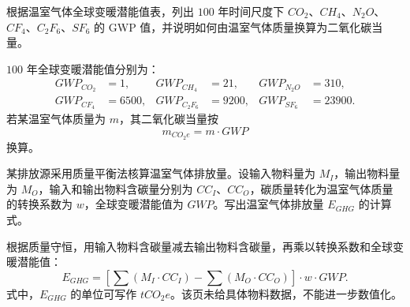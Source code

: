 \begin{problem}[温室气体全球变暖潜能值查表]\label{exer:calc_01_intro_p087_01}
根据温室气体全球变暖潜能值表，列出 \(100\) 年时间尺度下 \(CO_2\)、\(CH_4\)、\(N_2O\)、\(CF_4\)、\(C_2F_6\)、\(SF_6\) 的 GWP 值，并说明如何由温室气体质量换算为二氧化碳当量。
\end{problem}

\begin{solution}
\(100\) 年全球变暖潜能值分别为：
\begin{equation*}
\begin{aligned}
GWP_{CO_2} &= 1, &
GWP_{CH_4} &= 21, &
GWP_{N_2O} &= 310,\\
GWP_{CF_4} &= 6500, &
GWP_{C_2F_6} &= 9200, &
GWP_{SF_6} &= 23900.
\end{aligned}
\end{equation*}
若某温室气体质量为 \(m\)，其二氧化碳当量按
\begin{equation}
m_{CO_2e} = m \cdot GWP
\end{equation}
换算。
\end{solution}

\begin{problem}[质量平衡法碳核算]\label{exer:calc_01_intro_p108_01}
某排放源采用质量平衡法核算温室气体排放量。设输入物料量为 \(M_I\)，输出物料量为 \(M_O\)，输入和输出物料含碳量分别为 \(CC_I\)、\(CC_O\)，碳质量转化为温室气体质量的转换系数为 \(w\)，全球变暖潜能值为 \(GWP\)。写出温室气体排放量 \(E_{GHG}\) 的计算式。
\end{problem}

\begin{solution}
根据质量守恒，用输入物料含碳量减去输出物料含碳量，再乘以转换系数和全球变暖潜能值：
\begin{equation}
E_{GHG}
= \left[\sum(M_I \cdot CC_I) - \sum(M_O \cdot CC_O)\right]\cdot w \cdot GWP.
\end{equation}
式中，\(E_{GHG}\) 的单位可写作 \(\unit{tCO_2e}\)。该页未给具体物料数据，不能进一步数值化。
\end{solution}
